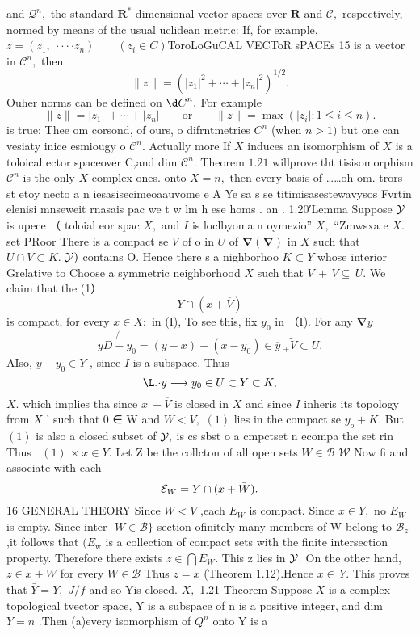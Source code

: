 and ${\mathcal{Q}}^{n},$ the standard ${\boldsymbol{R}}^{\ast}$ dimensional vector spaces over ${\boldsymbol{R}}$ and $\textstyle{\mathcal{C}},$ respectively, normed by means of thc usual uclidean metric: If, for example, $z=(z_{1},\ \cdot\cdot\cdot\cdot z_{n})\qquad(z_{i}\in C)$ToroLoGuCAL VECToR sPACEs 15 is a vector in ${\mathcal{C}}^{n},$ then $$ \|z\|=(|z_{1}|^{2}+\cdots+|z_{n}|^{2})^{1/2}. $$ Ouher norms can be defined on ${\d C}^{n}.$ For example $$ \|z\|=|z_{1}|\,+\cdots+|z_{n}|\qquad{\mathrm{or}}\qquad\|z\|=\operatorname*{max}\left(|z_{i}|:1\leq i\leq n\right). $$ is true: Thee om corsond, of ours, o difrntmetries $C^{n}$ (when $n>1)$ but one can vesiaty inice esmiougy o ${\mathcal{C}}^{n}.$ Actually more If $X$ induces an isomorphism of $\textstyle X$ is a toloical ector spaceover C,and dim ${\mathcal{C}}^{n}.$ Theorem $1.21$ willprove tht tisisomorphism ${\mathcal{C}}^{n}$ is the only $X$ complex ones. onto $X=n,$ then every basis of ……oh om. trors st etoy necto a n iesasisecimeoaauvome e A Ye sa s se titimisasestewavysos Fvrtin elenisi mnseweit rnasais pac we t w lm h ese homs . an . 1.20′Lemma Suppose ${\cal{Y}}$ is upece （ toloial eor spac $X,$ and $\boldsymbol{\mathit{I}}$ is loclbyoma n oymezio” $X,$ “Zmwsxa e $X.$ set PRoor There is a compact se ${\mathbf{}}V$ of o in $U$ of $\mathbf{\nabla}(\mathbf{\nabla})$ in $\textstyle X$ such that $U\cap V\subset K.$ ${\cal{Y}})$ contains O. Hence there s a nighborhoo $K\subset Y$ whose interior Grelative to Choose a symmetric neighborhood $\textstyle X$ such that $\overline{{{V}}}\,+\,\overline{{{V}}}\subseteq\,U.$ We claim that the (1） $$ Y\cap(x+{\overline{{V}}}) $$ is compact, for every $x\in X{\mathrm{:}}$ in (I), To see this, fix $y_{0}$ in （I). For any $\mathbf{\nabla}y$ $$ y\not{D-y_{0}}=(y-x)+(x-y_{0})\in\overline{{{y}}}\ _{+}\tilde{V}\subset U. $$ AIso, $y-y_{0}\in Y$ , since $\boldsymbol{\mathit{I}}$ is a subspace. Thus $$ \L_{\cdot}{\cdot}y\longrightarrow y_{0}\in U\subset Y\subset K, $$ $X.$ which implies tha since $x\ +{\overline{{V}}}$ is closed in $X$ and since $\boldsymbol{\mathit{I}}$ inheris its topology from $\textstyle X$ ' such that 0 ∈ W and $W<V,$ $\operatorname{\mathcal{(1)}}$ lies in the compact se $y_{o}+K.$ But $\operatorname{\mathcal{(1)}}$ is also a closed subset of ${\cal{Y}},$ is cs sbst o a cmpctset n ecompa the set rin Thus $\operatorname{\mathcal{}}(1)$ $\times\ x\in Y.$ Let Z be the collcton of all open sets $W\in{\mathcal{B}}$ $\mathcal{W}$ Now fi and associate with cach $$ {\cal E}_{W}=Y\cap(x+\bar{W}). $$16 GENERAL THEORY Since $W<V$ ,each $E_{W}$ is compact. Since $x\in Y,$ no $E_{W}$ is empty. Since inter- $W\in{\mathcal{B}}\}$ section ofinitely many members of W belong to ${\mathcal{B}}_{z}$ ,it follows that $(E_{\mathrm{w}}$ is a collection of compact sets with the finite intersection property. Therefore there exists $z\in\bigcap E_{W}.$ This z lies in ${\cal{Y}}.$ On the other hand, $z\in x+W$ for every $W\in{\mathcal{B}}$ Thus $z=x$ (Theorem 1.12).Hence $x\in\,Y.$ This proves that ${\bar{Y}}=Y,$ $J/f$ and so Yis closed. $X,$ 1.21 Thcorem Suppose $X$ is a complex topological tvector space, Y is a subspace of n is a positive integer, and dim $\textstyle Y=n$ .Then (a)every isomorphism of $Q^{n}$ onto Y is a 